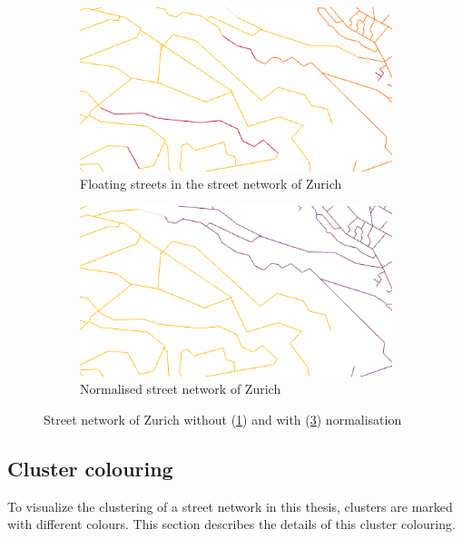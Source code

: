 \documentclass[11pt, a4paper]{report}
\begin{document}
\begin{figure}
    \centering
    \begin{subfigure}[b]{\textwidth}
        \begin{mdframed}[style=mdthight]
            \includegraphics[width=\linewidth]{zuerich_street_error_cropped.png}
        \end{mdframed}
        \caption{Floating streets in the street network of Zurich}
        \label{fig:zuerich_error}
    \end{subfigure}
    \begin{subfigure}[b]{\textwidth}
        \begin{mdframed}[style=mdthight]
            \includegraphics[width=\linewidth]{zuerich_street_fixed_cropped.png}
        \end{mdframed}
        \caption{Normalised street network of Zurich}
        \label{fig:zuerich_fixed}
    \end{subfigure}
    \caption{Street network of Zurich without (\ref{fig:zuerich_error}) and with (\ref{fig:zuerich_fixed}) normalisation}
\end{figure}

\subsection{Cluster colouring}
To visualize the clustering of a street network in this thesis, clusters are marked with different colours. This section describes the details of this cluster colouring.
\end{document}
